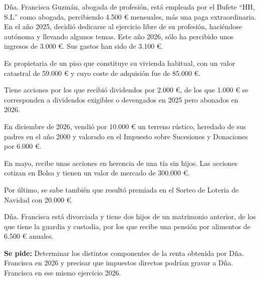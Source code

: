 \documentclass[11pt,a4paper,openany]{article}
\begin{document}
\begin{enunciadoBox}
Dña. Francisca Guzmán, abogada de profesión, está empleada por el Bufete “HH, S.L” como abogada, percibiendo 4.500 \euro{} mensuales, más una paga extraordinaria. En el año 2025, decidió dedicarse al ejercicio libre de su profesión, haciéndose autónoma y llevando algunos temas. Este año 2026, sólo ha percibido unos ingresos de 3.000 \euro{}. Sus gastos han sido de 3.100 \euro{}.

Es propietaria de un piso que constituye su vivienda habitual, con un valor catastral de 59.000 \euro{} y cuyo coste de adquisión fue de 85.000 \euro{}.

Tiene acciones por los que recibió dividendos por 2.000 \euro{}, de los que 1.000 \euro{} se corresponden a dividendos exigibles o devengados en 2025 pero abonados en 2026.

En diciembre de 2026, vendió por 10.000 \euro{} un terreno rústico, heredado de sus padres en el año 2000 y valorado en el Impuesto sobre Sucesiones y Donaciones por 6.000 \euro{}.

En mayo, recibe unas acciones en herencia de una tía sin hijos. Las acciones cotizan en Bolsa y tienen un valor de mercado de 300.000 \euro{}.

Por último, se sabe también que resultó premiada en el Sorteo de Loteria de Navidad con 20.000 \euro{}.

Dña. Francisca está divorciada y tiene dos hijos de un matrimonio anterior, de los que tiene la guardia y custodia, por los que recibe una pensión por alimentos de 6.500 \euro{} anuales.

\textbf{Se pide:} Determinar los distintos componentes de la renta obtenida por Dña. Francisca en 2026 y precisar que impuestos directos podrían gravar a Dña. Francisca en ese mismo ejercicio 2026.
\end{enunciadoBox}
\end{document}

